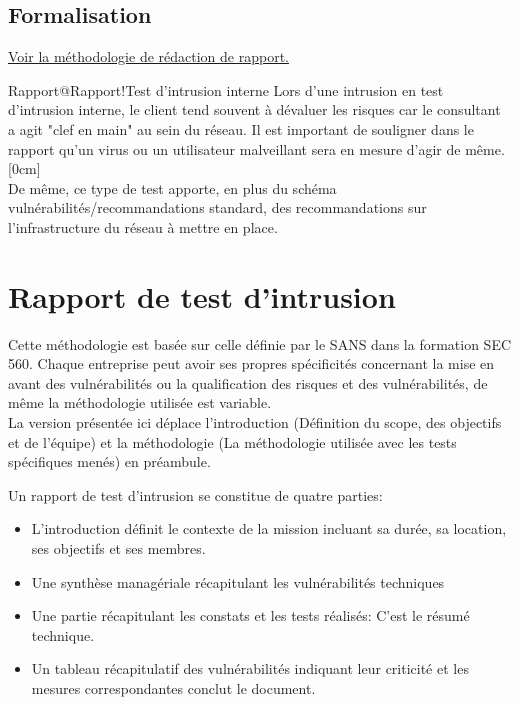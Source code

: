 \documentclass[twoside,a4paper,12pt,titlepage]{book}
\newcommand{\MarginPar}[2]{\marginnote{\scriptsize #1}[#2]}
\begin{document}
\subsection{Formalisation}
\ForwardToIndex \hspace{1em} \hyperref[Rapport]{Voir la méthodologie de rédaction de rapport.}
\begin{Define}{Rapport@Rapport!Test d'intrusion interne}
	Lors d'une intrusion en test d'intrusion interne, le client tend souvent à dévaluer les risques car le consultant a agit "clef en main" au sein du réseau. Il est important de souligner dans le rapport qu'un virus ou un utilisateur malveillant sera en mesure d'agir de même.\MarginPar{\textbf{Rapport}}{0cm}\\
	De même, ce type de test apporte, en plus du schéma vulnérabilités/recommandations standard, des recommandations sur l'infrastructure du réseau à mettre en place.
\end{Define}

\section{Rapport de test d'intrusion\label{Rapport}}
\begin{Warning}
Cette méthodologie est basée sur celle définie par le SANS dans la formation SEC 560. Chaque entreprise peut avoir ses propres spécificités concernant la mise en avant des vulnérabilités ou la qualification des risques et des vulnérabilités, de même la méthodologie utilisée est variable.\\
La version présentée ici déplace l'introduction (Définition du scope, des objectifs et de l'équipe) et la méthodologie (La méthodologie utilisée avec les tests spécifiques menés) en préambule.

\end{Warning}
Un rapport de test d'intrusion se constitue de quatre parties:\begin{itemize}
\item L'introduction définit le contexte de la mission incluant sa durée, sa location, ses objectifs et ses membres.
\item Une  synthèse managériale récapitulant les vulnérabilités techniques
\item Une partie récapitulant les constats et les tests réalisés: C'est le résumé technique.
\item Un tableau récapitulatif des vulnérabilités indiquant leur criticité et les mesures correspondantes conclut le document.
\end{itemize}
\end{document}
